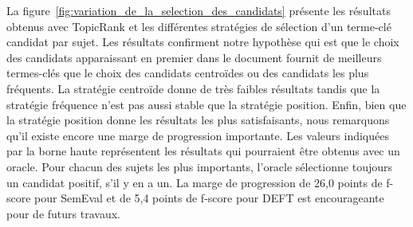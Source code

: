     La figure~\ref{fig:variation_de_la_selection_des_candidats} présente les
    résultats obtenus avec TopicRank et les différentes stratégies de sélection
    d'un terme-clé candidat par sujet. Les résultats confirment notre hypothèse
    qui est que le choix des candidats apparaissant en premier dans le document
    fournit de meilleurs termes-clés que le choix des candidats centroïdes ou
    des candidats les plus fréquents. La stratégie \og{}centroïde\fg{} donne de
    très faibles résultats tandis que la stratégie \og{}fréquence\fg{} n'est pas
    aussi stable que la stratégie \og{}position\fg{}. Enfin, bien que la
    stratégie \og{}position\fg{} donne les résultats les plus satisfaisants,
    nous remarquons qu'il existe encore une marge de progression importante. Les
    valeurs indiquées par la borne haute représentent les résultats qui
    pourraient être obtenus avec un oracle. Pour chacun des sujets les plus
    importants, l'oracle sélectionne toujours un candidat positif, s'il y en a
    un. La marge de progression de 26,0 points de f-score pour SemEval et de 5,4
    points de f-score pour DEFT est encourageante pour de futurs travaux.
